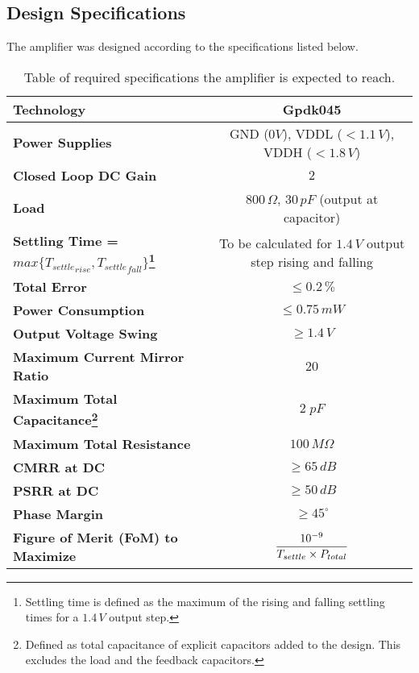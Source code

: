 \documentclass[12pt, fleqn]{article}
\begin{document}
\subsection{Design Specifications}
    The amplifier was designed according to the specifications listed below.\\[0.5cm]
    \begin{table}[H]
        \centering
        \setlength{\tabcolsep}{4pt}
        \renewcommand{\arraystretch}{2}
        \begin{tabular}{|l|c|}
            \hline
            \textbf{Technology} & Gpdk045\\
            \hline
            \textbf{Power Supplies} & GND ($0V$), VDDL ($< 1.1\,V$), VDDH ($< 1.8\,V$)\\
            \hline
            \textbf{Closed Loop DC Gain} & $2$\\
            \hline
            \textbf{Load} & $800\,\Omega$, $30\,pF$ (output at capacitor)\\
            \hline
            \textbf{Settling Time = $max\{{T_{settle}}_{rise}, {T_{settle}}_{fall}\}$\footnote{Settling time is defined as the maximum of the rising and falling settling times for a $1.4\,V$ output step.}} & To be calculated for $1.4\,V$ output step rising and falling\\
            \hline
            \textbf{Total Error} & $\leq 0.2\,\%$\\
            \hline
            \textbf{Power Consumption} & $\leq 0.75\,mW$\\
            \hline
            \textbf{Output Voltage Swing} & $\geq 1.4\,V$\\
            \hline
            \textbf{Maximum Current Mirror Ratio} & $20$\\
            \hline
            \textbf{Maximum Total Capacitance\footnote{Defined as total capacitance of explicit capacitors added to the design. This excludes the load and the feedback capacitors.}} & $2\;pF$\\
            \hline
            \textbf{Maximum Total Resistance} & $100\,M\Omega$\\
            \hline
            \textbf{CMRR at DC} & $\geq 65\,dB$\\
            \hline
            \textbf{PSRR at DC} & $\geq 50\,dB$\\
            \hline
            \textbf{Phase Margin} & $\geq {45}^\circ$\\
            \hline
            \textbf{Figure of Merit (FoM) to Maximize} & $\mathlarger{\frac{{10}^{-9}}{T_{settle} \times P_{total}}}$\\
            \hline
        \end{tabular}
        \caption{Table of required specifications the amplifier is expected to reach.
        \label{tab:specs1}} 
    \end{table}
\end{document}
